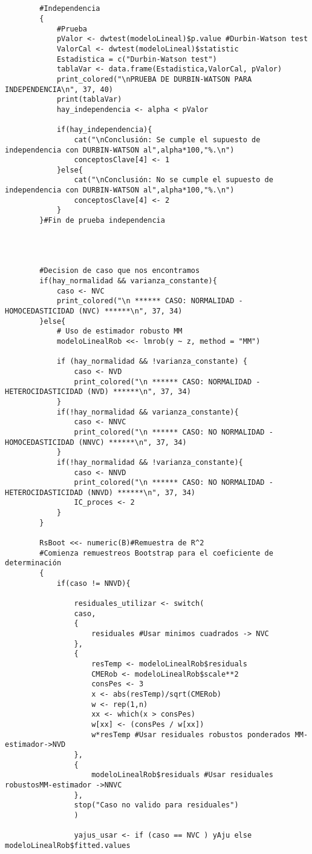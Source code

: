 \begin{verbatim}
		
		
		#Independencia
		{
			#Prueba
			pValor <- dwtest(modeloLineal)$p.value #Durbin-Watson test
			ValorCal <- dwtest(modeloLineal)$statistic
			Estadistica = c("Durbin-Watson test")
			tablaVar <- data.frame(Estadistica,ValorCal, pValor)
			print_colored("\nPRUEBA DE DURBIN-WATSON PARA INDEPENDENCIA\n", 37, 40)
			print(tablaVar)
			hay_independencia <- alpha < pValor
			
			if(hay_independencia){
				cat("\nConclusión: Se cumple el supuesto de independencia con DURBIN-WATSON al",alpha*100,"%.\n")
				conceptosClave[4] <- 1
			}else{
				cat("\nConclusión: No se cumple el supuesto de independencia con DURBIN-WATSON al",alpha*100,"%.\n")
				conceptosClave[4] <- 2
			}
		}#Fin de prueba independencia
		
		
		
		
		#Decision de caso que nos encontramos
		if(hay_normalidad && varianza_constante){
			caso <- NVC
			print_colored("\n ****** CASO: NORMALIDAD - HOMOCEDASTICIDAD (NVC) ******\n", 37, 34)
		}else{
			# Uso de estimador robusto MM  
			modeloLinealRob <<- lmrob(y ~ z, method = "MM")
			
			if (hay_normalidad && !varianza_constante) {
				caso <- NVD
				print_colored("\n ****** CASO: NORMALIDAD - HETEROCIDASTICIDAD (NVD) ******\n", 37, 34)
			}
			if(!hay_normalidad && varianza_constante){
				caso <- NNVC
				print_colored("\n ****** CASO: NO NORMALIDAD - HOMOCEDASTICIDAD (NNVC) ******\n", 37, 34)
			}
			if(!hay_normalidad && !varianza_constante){
				caso <- NNVD
				print_colored("\n ****** CASO: NO NORMALIDAD - HETEROCIDASTICIDAD (NNVD) ******\n", 37, 34)
				IC_proces <- 2
			}
		}
		
		RsBoot <<- numeric(B)#Remuestra de R^2
		#Comienza remuestreos Bootstrap para el coeficiente de determinación
		{
			if(caso != NNVD){
				
				residuales_utilizar <- switch(
				caso,
				{
					residuales #Usar minimos cuadrados -> NVC
				},
				{
					resTemp <- modeloLinealRob$residuals 
					CMERob <- modeloLinealRob$scale**2
					consPes <- 3
					x <- abs(resTemp)/sqrt(CMERob)
					w <- rep(1,n)
					xx <- which(x > consPes) 
					w[xx] <- (consPes / w[xx])
					w*resTemp #Usar residuales robustos ponderados MM-estimador->NVD
				},
				{
					modeloLinealRob$residuals #Usar residuales robustosMM-estimador ->NNVC
				},
				stop("Caso no valido para residuales")
				)
				
				yajus_usar <- if (caso == NVC ) yAju else modeloLinealRob$fitted.values
				

\end{verbatim}
